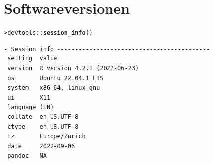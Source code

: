 \documentclass[oneside, 10pt]{book}\usepackage[]{graphicx}\usepackage[]{xcolor}
\makeatletter
\newcommand{\hlopt}[1]{\textcolor[rgb]{0,0,0}{#1}}%
\newcommand{\hlstd}[1]{\textcolor[rgb]{0.345,0.345,0.345}{#1}}%
\newcommand{\hlkwd}[1]{\textcolor[rgb]{0.737,0.353,0.396}{\textbf{#1}}}%
\newenvironment{kframe}{%
 \def\at@end@of@kframe{}%
 \ifinner\ifhmode%
  \def\at@end@of@kframe{\end{minipage}}%
  \begin{minipage}{\columnwidth}%
 \fi\fi%
 \def\FrameCommand##1{\hskip\@totalleftmargin \hskip-\fboxsep
 \colorbox{shadecolor}{##1}\hskip-\fboxsep
     \hskip-\linewidth \hskip-\@totalleftmargin \hskip\columnwidth}%
 \MakeFramed {\advance\hsize-\width
   \@totalleftmargin\z@ \linewidth\hsize
   \@setminipage}}%
 {\par\unskip\endMakeFramed%
 \at@end@of@kframe}
\newenvironment{knitrout}{}{} %
\makeatother
\begin{document}
\chapter{Softwareversionen}\label{app:versions}
\begin{knitrout}
\color{fgcolor}\begin{kframe}
\begin{alltt}
\hlstd{> }\hlstd{devtools}\hlopt{::}\hlkwd{session_info}\hlstd{()}
\end{alltt}
\begin{verbatim}
- Session info -------------------------------------------
 setting  value
 version  R version 4.2.1 (2022-06-23)
 os       Ubuntu 22.04.1 LTS
 system   x86_64, linux-gnu
 ui       X11
 language (EN)
 collate  en_US.UTF-8
 ctype    en_US.UTF-8
 tz       Europe/Zurich
 date     2022-09-06
 pandoc   NA


\end{verbatim}
\end{kframe}
\end{knitrout}
\end{document}
